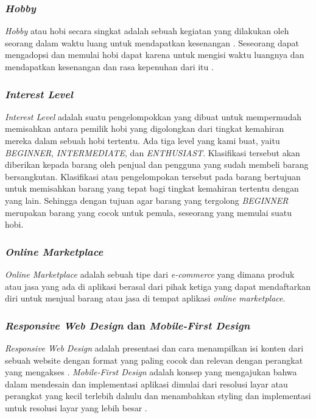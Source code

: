 \documentclass[a4paper]{article}
\newcommand{\subsubbab}[1]{%
    \subsubsection{#1}%
}
\begin{document}
\subsubbab{\textit{Hobby}}
\textit{Hobby} atau hobi secara singkat adalah sebuah kegiatan yang dilakukan oleh seorang dalam waktu luang untuk mendapatkan kesenangan \autocite{Dict_hobi}. Seseorang dapat mengadopsi dan memulai hobi dapat karena untuk mengisi waktu luangnya dan mendapatkan kesenangan dan rasa kepenuhan dari itu \autocite{linkedin_hobi}.

\subsubbab{\textit{Interest Level}}
\textit{Interest Level} adalah suatu pengelompokkan yang dibuat untuk mempermudah memisahkan antara pemilik hobi yang digolongkan dari tingkat kemahiran mereka dalam sebuah hobi tertentu. Ada tiga level yang kami buat, yaitu \textit{BEGINNER}, \textit{INTERMEDIATE}, dan \textit{ENTHUSIAST}. Klasifikasi tersebut akan diberikan kepada barang oleh penjual dan pengguna yang sudah membeli barang bersangkutan. Klasifikasi atau pengelompokan tersebut pada barang bertujuan untuk memisahkan barang yang tepat bagi tingkat kemahiran tertentu dengan yang lain. Sehingga dengan tujuan agar barang yang tergolong \textit{BEGINNER} merupakan barang yang cocok untuk pemula, seseorang yang memulai suatu hobi.

\subsubbab{\textit{Online Marketplace}}
\textit{Online Marketplace} adalah sebuah tipe dari \textit{e-commerce} yang dimana  produk atau jasa yang ada di aplikasi berasal dari pihak ketiga yang dapat mendaftarkan diri untuk menjual barang atau jasa di tempat aplikasi \textit{online marketplace}. \autocite{pediaa_marketplace}

\subsubbab{\textit{Responsive Web Design} dan \textit{Mobile-First Design}}
\textit{Responsive Web Design} adalah presentasi dan cara menampilkan isi konten dari sebuah website dengan format yang paling cocok dan relevan dengan perangkat yang mengakses \autocite[5]{Frain_2022}. \textit{Mobile-First Design} adalah konsep yang mengajukan bahwa dalam mendesain dan implementasi aplikasi dimulai dari resolusi layar atau perangkat yang kecil terlebih dahulu dan menambahkan styling dan implementasi untuk resolusi layar yang lebih besar \autocite[5]{Ward_2017}.
\end{document}
